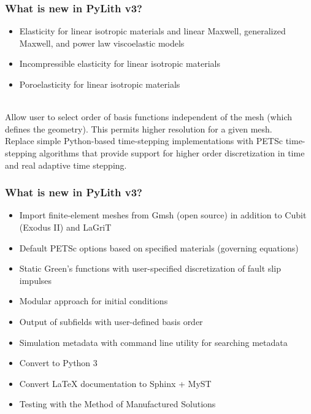 \documentclass[aspectratio=169]{beamer}
\begin{document}
\begin{frame}
  \frametitle{What is new in PyLith v3?}
  \summary{}

  \begin{itemize}
    \begin{itemize}
    \item Elasticity for linear isotropic materials and linear Maxwell, generalized Maxwell, and power law viscoelastic models
    \item Incompressible elasticity for linear isotropic materials
    \item Poroelasticity for linear isotropic materials
    \end{itemize}
     \\
    Allow user to select order of basis functions independent of the mesh (which defines the geometry). This permits higher resolution for a given mesh.
     \\
    Replace simple Python-based time-stepping implementations with PETSc time-stepping algorithms that provide support for higher order discretization in time and real adaptive time stepping.
  \end{itemize}

\end{frame}


\begin{frame}
  \frametitle{What is new in PyLith v3?}
  \summary{}

  \begin{itemize}
  \item Import finite-element meshes from Gmsh (open source) in addition to Cubit (Exodus II) and LaGriT
  \item Default PETSc options based on specified materials (governing equations)
  \item Static Green's functions with user-specified discretization of fault slip impulses
  \item Modular approach for initial conditions
  \item Output of subfields with user-defined basis order
  \item Simulation metadata with command line utility for searching metadata
  \item Convert to Python 3
  \item Convert LaTeX documentation to Sphinx + MyST
  \item Testing with the Method of Manufactured Solutions
\end{itemize}

\end{frame}
\end{document}
